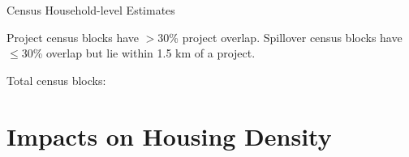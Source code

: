 \documentclass[12pt]{article}
\begin{document}
\begin{table}
\caption{Census Household-level Estimates}\label{table:censusestimates}
\centering
\begin{adjustbox}{angle=90}
\resizebox{!}{.3\textwidth}{  

}
\end{adjustbox}
\begin{adjustbox}{angle=90}
\footnotesize{Project census blocks have $>$30\% project overlap.  Spillover census blocks have $\leq$30\% overlap but lie within 1.5 km of a project.}
\end{adjustbox}
\begin{adjustbox}{angle=90}
\footnotesize{Total census blocks: }
\end{adjustbox}
\end{table}


% 



\section{Impacts on Housing Density}
\end{document}
